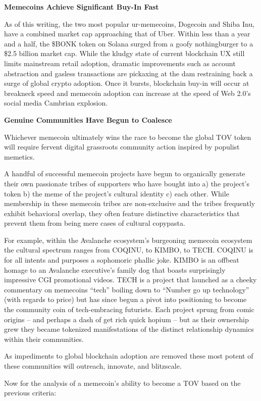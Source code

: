 \documentclass{article}
\begin{document}
\textbf{Memecoins Achieve Significant Buy-In Fast}

As of this writing, the two most popular ur-memecoins, Dogecoin and Shiba Inu, have a combined market cap approaching that of Uber. Within less than a year and a half, the \$BONK token on Solana surged from a goofy nothingburger to a \$2.5 billion market cap. While the kludgy state of current blockchain UX still limits mainstream retail adoption, dramatic improvements such as account abstraction and gasless transactions are pickaxing at the dam restraining back a surge of global crypto adoption. Once it bursts, blockchain buy-in will occur at breakneck speed and memecoin adoption can increase at the speed of Web 2.0's social media Cambrian explosion.

\textbf{Genuine Communities Have Begun to Coalesce}

Whichever memecoin ultimately wins the race to become the global TOV token will require fervent digital grassroots community action inspired by populist memetics.

A handful of successful memecoin projects have begun to organically generate their own passionate tribes of supporters who have bought into a) the project's token b) the meme of the project's cultural identity c) each other. While membership in these memecoin tribes are non-exclusive and the tribes frequently exhibit behavioral overlap, they often feature distinctive characteristics that prevent them from being mere cases of cultural copypasta.

For example, within the Avalanche ecosystem's burgeoning memecoin ecosystem the cultural spectrum ranges from COQINU, to KIMBO, to TECH. COQINU is for all intents and purposes a sophomoric phallic joke. KIMBO is an offbeat homage to an Avalanche executive's family dog that boasts surprisingly impressive CGI promotional videos. TECH is a project that launched as a cheeky commentary on memecoins ``tech'' boiling down to ``Number go up technology'' (with regards to price) but has since begun a pivot into positioning to become the community coin of tech-embracing futurists. Each project sprung from comic origins -- and perhaps a dash of get rich quick hopium -- but as their ownership grew they became tokenized manifestations of the distinct relationship dynamics within their communities.

As impediments to global blockchain adoption are removed these most potent of these communities will outreach, innovate, and blitzscale.

Now for the analysis of a memecoin's ability to become a TOV based on the previous criteria:
\end{document}
